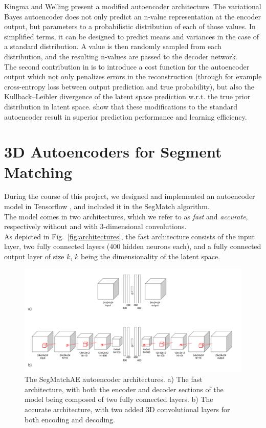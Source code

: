 Kingma and Welling \cite{variational-autoencoder} present a modified autoencoder architecture. The variational Bayes autoencoder does not only predict an n-value representation at the encoder output, but parameters to a probabilistic distribution of each of those values. In simplified terms, it can be designed to predict means and variances in the case of a standard distribution. A value is then randomly sampled from each distribution, and the resulting n-values are passed to the decoder network.\\

The second contribution in \citet{variational-autoencoder} is to introduce a cost function for the autoencoder output which not only penalizes errors in the reconstruction (through for example cross-entropy loss between output prediction and true probability), but also the Kullback–Leibler divergence of the latent space prediction w.r.t. the true prior distribution in latent space. \citet{variational-autoencoder} show that these modifications to the standard autoencoder result in superior prediction performance and learning efficiency.

\section{3D Autoencoders for Segment Matching}
\label{sec:ae-implementation}

During the course of this project, we designed and implemented an autoencoder model in Tensorflow \cite{tensorflow}, and included it in the SegMatch algorithm.\\

The model comes in two architectures, which we refer to as \textit{fast} and \textit{accurate}, respectively without and with 3-dimensional convolutions.\\

As depicted in Fig.~\ref{fig:architectures}, the fast architecture consists of the input layer, two fully connected layers (400 hidden neurons each), and a fully connected output layer of size $k$, $k$ being the dimensionality of the latent space.

\begin{figure}
  \centering
  \includegraphics[width=5.2in]{images/architecture.pdf}
  \caption{The SegMatchAE autoencoder architectures. a) The fast architecture, with both the encoder and decoder sections of the model being composed of two fully connected layers. b) The accurate architecture, with two added 3D convolutional layers for both encoding and decoding.}
  \label{fig:architecture}
\end{figure}

